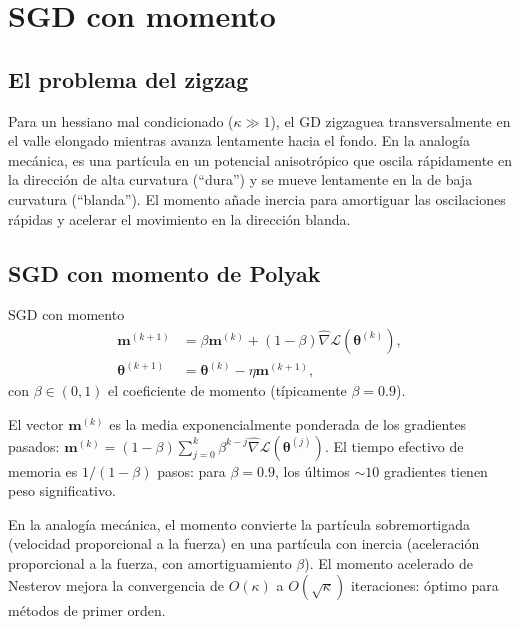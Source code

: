 \section{SGD con momento}
\label{sec:momentum}


\subsection{El problema del zigzag}
\label{subsec:zigzag}

Para un hessiano mal condicionado ($\kappa \gg 1$), el GD zigzaguea
transversalmente en el valle elongado mientras avanza lentamente hacia el
fondo. En la analogía mecánica, es una partícula en un potencial anisotrópico
que oscila rápidamente en la dirección de alta curvatura (``dura'') y se
mueve lentamente en la de baja curvatura (``blanda''). El momento añade
inercia para amortiguar las oscilaciones rápidas y acelerar el movimiento
en la dirección blanda.

\subsection{SGD con momento de Polyak}
\label{subsec:polyak}

\begin{definicion}{SGD con momento}
\label{def:sgd_momentum}
\begin{align}
  \bm{m}^{(k+1)} &= \beta\bm{m}^{(k)}
  + (1-\beta)\hat{\nabla}\mathcal{L}(\bm{\theta}^{(k)}),
  \label{eq:momento}\\
  \bm{\theta}^{(k+1)} &= \bm{\theta}^{(k)} - \eta\bm{m}^{(k+1)},
  \label{eq:sgd_mom}
\end{align}
con $\beta \in (0,1)$ el coeficiente de momento (típicamente $\beta = 0.9$).
\end{definicion}

El vector $\bm{m}^{(k)}$ es la media exponencialmente ponderada de los
gradientes pasados: $\bm{m}^{(k)} = (1-\beta)\sum_{j=0}^k
\beta^{k-j}\hat{\nabla}\mathcal{L}(\bm{\theta}^{(j)})$. El tiempo
efectivo de memoria es $1/(1-\beta)$ pasos: para $\beta = 0.9$, los
últimos $\sim 10$ gradientes tienen peso significativo.

En la analogía mecánica, el momento convierte la partícula sobremortigada
(velocidad proporcional a la fuerza) en una partícula con inercia
(aceleración proporcional a la fuerza, con amortiguamiento $\beta$). El
momento acelerado de Nesterov mejora la convergencia de $O(\kappa)$ a
$O(\sqrt{\kappa})$ iteraciones: óptimo para métodos de primer orden.

